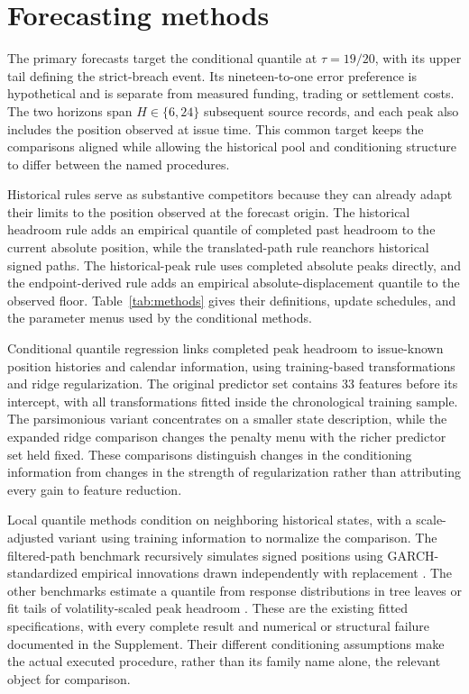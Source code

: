\documentclass[11pt,a4paper]{article}
\begin{document}
\FloatBarrier

\section{Forecasting methods}\label{sec:methods}

The primary forecasts target the conditional quantile at \(\tau=19/20\), with its upper tail defining the strict-breach event. Its nineteen-to-one error preference is hypothetical and is separate from measured funding, trading or settlement costs. The two horizons span \(H\in\{6,24\}\) subsequent source records, and each peak also includes the position observed at issue time. This common target keeps the comparisons aligned while allowing the historical pool and conditioning structure to differ between the named procedures.


Historical rules serve as substantive competitors because they can already adapt their limits to the position observed at the forecast origin. The historical headroom rule adds an empirical quantile of completed past headroom to the current absolute position, while the translated-path rule reanchors historical signed paths. The historical-peak rule uses completed absolute peaks directly, and the endpoint-derived rule adds an empirical absolute-displacement quantile to the observed floor. Table~\ref{tab:methods} gives their definitions, update schedules, and the parameter menus used by the conditional methods.


Conditional quantile regression links completed peak headroom to issue-known position histories and calendar information, using training-based transformations and ridge regularization. The original predictor set contains 33 features before its intercept, with all transformations fitted inside the chronological training sample. The parsimonious variant concentrates on a smaller state description, while the expanded ridge comparison changes the penalty menu with the richer predictor set held fixed. These comparisons distinguish changes in the conditioning information from changes in the strength of regularization rather than attributing every gain to feature reduction.


Local quantile methods condition on neighboring historical states, with a scale-adjusted variant using training information to normalize the comparison. The filtered-path benchmark recursively simulates signed positions using GARCH-standardized empirical innovations drawn independently with replacement \citep{hull1998,barone1999}. The other benchmarks estimate a quantile from response distributions in tree leaves or fit tails of volatility-scaled peak headroom \citep{meinshausen2006,mcneilfrey2000}. These are the existing fitted specifications, with every complete result and numerical or structural failure documented in the Supplement. Their different conditioning assumptions make the actual executed procedure, rather than its family name alone, the relevant object for comparison.
\end{document}
